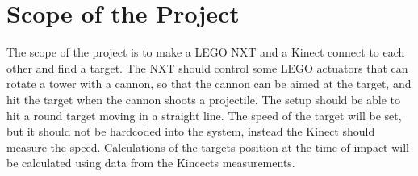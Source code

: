 \section{Scope of the Project}
The scope of the project is to make a LEGO NXT and a Kinect connect to each other and find a target. The NXT should control some LEGO actuators that can rotate a tower with a cannon, so that the cannon can be aimed at the target, and hit the target when the cannon shoots a projectile. The setup should be able to hit a round target moving in a straight line. The speed of the target will be set, but it should not be hardcoded into the system, instead the Kinect should measure the speed. Calculations of the targets position at the time of impact will be calculated using data from the Kincects measurements.